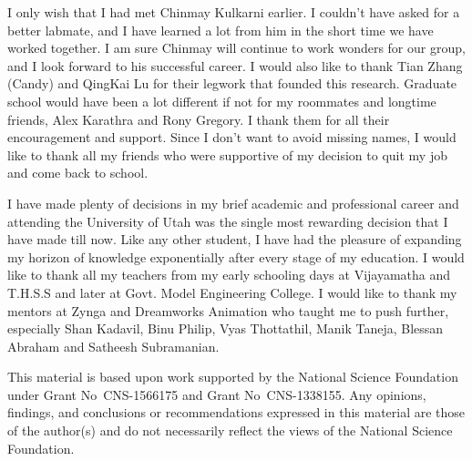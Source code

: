 I only wish that I had met Chinmay Kulkarni earlier. 
I couldn't have asked for a better labmate, and I have learned a lot from him in the short time we have worked together. 
I am sure Chinmay will continue to work wonders for our group, and I look forward to his successful career. 
I would also like to thank Tian Zhang (Candy) and QingKai Lu for their legwork that founded this research. 
Graduate school would have been a lot different if not for my roommates and longtime friends, Alex Karathra and Rony Gregory. 
I thank them for all their encouragement and support. Since I don't want to avoid missing names, I would like to thank all my friends who were supportive of my decision to quit my job and come back to school.

I have made plenty of decisions in my brief academic and professional career and attending the University of Utah was the single most rewarding decision that I have made till now. 
Like any other student, I have had the pleasure of expanding my horizon of knowledge exponentially after every stage of my education. 
I would like to thank all my teachers from my early schooling days at Vijayamatha and T.H.S.S and later at Govt. Model Engineering College. 
I would like to thank my mentors at Zynga and Dreamworks Animation who taught me to push further, especially Shan Kadavil, Binu Philip, Vyas Thottathil, Manik Taneja, Blessan Abraham and Satheesh Subramanian.

This material is based upon work supported by the National Science Foundation \linebreak under Grant No\ CNS-1566175 and Grant No\ CNS-1338155.
Any opinions, findings, and conclusions or recommendations expressed in this material are those of the author(s) and do not necessarily reflect the views of the National Science Foundation.
